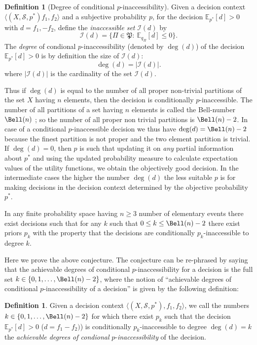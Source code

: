 \documentclass[10pt, letterpaper]{article}%
\theoremstyle{definition}
\newtheorem{definition}[theorem]{Definition}
\newcommand{\E}{\mathbb E}
\newcommand{\1}{\mathbf 1}
\def\change{\marginpar[\hfill Change]{Change}}
\def\changeA{\marginpar[\hfill $\downarrow$Change]{Change$\downarrow$}}
\def\changeZ{\marginpar[\hfill $\uparrow$Change]{Change$\uparrow$}}
\begin{document}
\begin{definition}[Degree of conditional $p$-inaccessibility] Given a decision context $\langle (X,\mathcal{S},p^*) f_1, f_2\rangle$ and a subjective probability $p$, for the decision $\E_{p^*}[d]>0$ with $d=f_1,-f_2$, define the \emph{inaccessible set} $\mathcal{I}(d)$ by
	\[
		\mathcal I(d)=\{\Pi\in\mathfrak P:\ \E_{q_\Pi}[d]\le 0\}.
	\]
	The \emph{degree} of condional $p$-inaccessibility (denoted by $\deg(d)$) of the decision $\E_{p^*}[d]>0$ is by definition the size of $\mathcal{I}(d)$:
	\[
		\deg(d)=|\mathcal I(d)|.
	\]
    where $|\mathcal{I}(d)|$ is the cardinality of the set $\mathcal{I}(d)$.
\end{definition}
Thus if $\deg(d)$ is equal to the number of all proper non-trivial partitions of the set $X$ having $n$ elements, then the decision is conditionally $p$-inaccessible. The number of all partitions of a set having $n$ elements is called the Bell-number $\Bell(n)$ \cite{Conway-Guy1996}; so the number of all proper non trivial partitions is $\Bell(n)-2$. In case of a conditional $p$-inaccessible decision we thus have $\deg(d)=\Bell(n)-2$ because the finest partition is not proper and the two element partition is trivial. If $\deg(d)=0$, then $p$ is such that updating it on \emph{any} partial information about $p^*$ and using the updated probability measure to calculate expectation values of the utility functions, we obtain the objectively good decision. In the intermediate cases the higher the number $\deg(d)$ the less suitable $p$ is for making decisions in the decision context determined by the objective probability $p^*$.    
\medskip

In any finite probability space having $n \geq 3$ number of elementary events there exist decisions %
such that for any $k$ such that $0 \leq k \leq \Bell(n) - 2$ there exist priors $p_k$ with the property that the decisions are conditionally $p_k$-inaccessible to degree $k$.

\medskip
Here we prove the above conjecture. %
The conjecture can be re-phrased by saying that the achievable degrees of conditional $p$-inaccessibility for a decision is the full set  $k\in\{0,1,\dots, \Bell(n)-2\}$, where the notion of ``achievable degrees of conditional $p$-inaccessibility of a decision'' is given by the following definition:

\begin{definition}
  Given a decision context $\big\langle (X,\mathcal{S},{p}^*),f_1,f_2\big\rangle$, we call the  numbers $k\in\{0,1,\dots, \Bell(n)-2\}$ for which there exist $p_k$ such that the decision $\E_{p^*}[d]>0$ ($d=f_1-f_2)$) is conditionally $p_k$-inaccessible to degree $\deg(d)=k$ the \emph{achievable degrees of condional} $p$-\emph{inaccessibility} of the decision.    
\end{definition}
\end{document}
